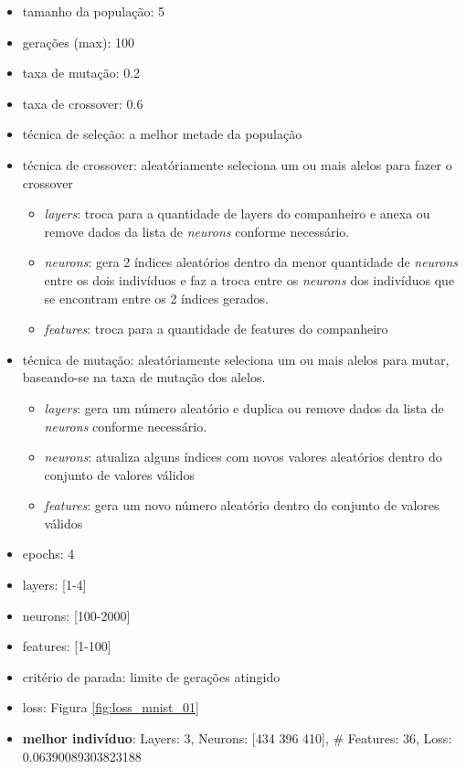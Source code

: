 \documentclass[twoside,conference,a4paper]{IEEEtran}
\begin{document}
\begin{itemize}
    \item tamanho da população: 5
    \item gerações (max): 100
    \item taxa de mutação: 0.2
    \item taxa de crossover: 0.6
    \item técnica de seleção: a melhor metade da população
    \item técnica de crossover: aleatóriamente seleciona um ou mais alelos para fazer o crossover
    \begin{itemize}
        \item \emph{layers}: troca para a quantidade de layers do companheiro e anexa ou remove dados da lista de \emph{neurons} conforme necessário.
        \item \emph{neurons}: gera 2 índices aleatórios dentro da menor quantidade de \emph{neurons} entre os dois indivíduos e faz a troca entre os \emph{neurons} dos indivíduos que se encontram entre os 2 índices gerados.
        \item \emph{features}: troca para a quantidade de features do companheiro
    \end{itemize}
    \item técnica de mutação: aleatóriamente seleciona um ou mais alelos para mutar, baseando-se na taxa de mutação dos alelos.
    \begin{itemize}
        \item \emph{layers}: gera um número aleatório e duplica ou remove dados da lista de \emph{neurons} conforme necessário.
        \item \emph{neurons}: atualiza alguns índices com novos valores aleatórios dentro do conjunto de valores válidos
        \item \emph{features}: gera um novo número aleatório dentro do conjunto de valores válidos
    \end{itemize}
    \item epochs: 4
    \item layers: [1-4]
    \item neurons: [100-2000]
    \item features: [1-100]
    \item critério de parada: limite de gerações atingido
    \item loss: Figura \ref{fig:loss_mnist_01}
    \item \textbf{melhor indivíduo}: Layers: 3, Neurons: [434 396 410], \# Features: 36, Loss: 0.06390089303823188
\end{itemize}
\end{document}
